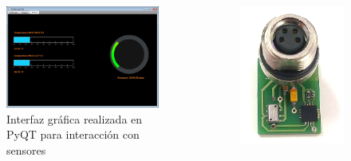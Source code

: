 \documentclass[]{beamer}
\begin{document}
\begin{frame}{}
  \begin{columns}
    \begin{column}{0.7\textwidth}
      \begin{figure}
        \includegraphics[width=\textwidth]{Docs/sensorfinal}
        \caption{Interfaz gráfica realizada en PyQT para interacción con sensores}
        \label{}
      \end{figure}
    \end{column}
    \begin{column}{0.3\textwidth}
      \begin{figure}
        \includegraphics[width=\textwidth]{Docs/Temppress}

\end{figure}
\end{column}
\end{columns}
\end{frame}
\end{document}
